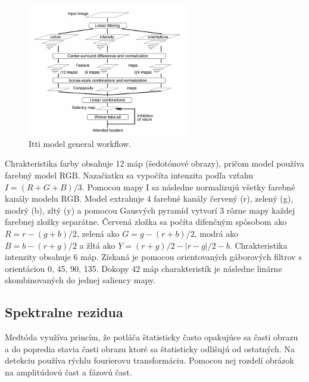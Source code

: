 \begin{figure}[H]
 \centering
 \includegraphics[width=7cm]{pics/itti-1.png}
 \caption{Itti model general workflow.}\label{wrap-fig:1}
\end{figure}
\vspace{10mm}

Chrakteristika farby obsahuje 12 máp (šedotónové obrazy), pričom model používa farebný model RGB. Nazačiatku sa vypočíta intenzita podľa vzťahu \begin{math} I = (R+G+B)/3\end{math}. Pomocou mapy I sa následne normalizujú všetky farebné kanály modelu RGB. Model extrahuje 4 farebné kanály červený (r), zelený (g), modrý (b), zltý (y) a pomocou Gausvých pyramíd vytvorí 3 rôzne mapy každej farebnej zložky separátne. Červená zložka sa počíta difenčným spôsobom ako \begin{math} R = r - (g + b)/2 \end{math}, zelená ako \begin{math} G = g - (r + b)/2 \end{math}, modrá ako \begin{math}B = b - (r + g)/2\end{math} a žltá ako \begin{math}Y = (r + g)/2 - |r - g|/2 - b\end{math}. Chrakteristika intenzity obsahuje 6 máp. Získaná je pomocou orientovaných gáborových filtrov s orientáciou 0\degree, 45\degree, 90\degree, 135\degree. Dokopy 42 máp charakteristík je následne linárne skombinovaných do jednej saliency mapy\cite{itty-98}.


\subsection{Spektralne rezidua}
Medtóda využíva princím, že potláča štatisticky často opakujúce sa časti obrazu a do popredia stavia časti obrazu ktoré sa štatisticky odlišujú od ostatných. Na detekciu používa rýchlu fourierovu transformáciu. Pomocou nej rozdelí obrázok na amplitúdovú čast a fázovú čast.

